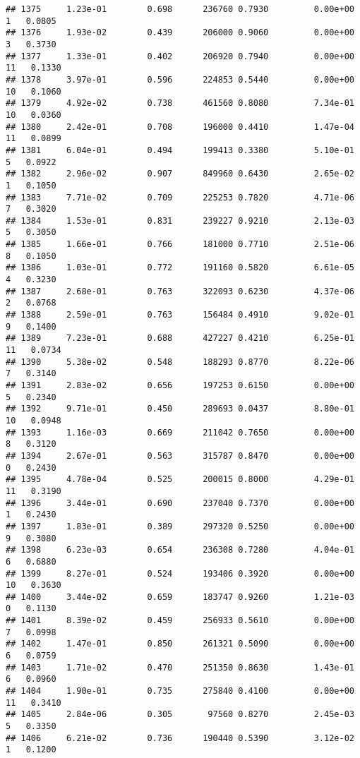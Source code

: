 \documentclass[
]{article}
\begin{document}
\begin{verbatim}
## 1375     1.23e-01        0.698      236760 0.7930         0.00e+00   1   0.0805
## 1376     1.93e-02        0.439      206000 0.9060         0.00e+00   3   0.3730
## 1377     1.33e-01        0.402      206920 0.7940         0.00e+00  11   0.1330
## 1378     3.97e-01        0.596      224853 0.5440         0.00e+00  10   0.1060
## 1379     4.92e-02        0.738      461560 0.8080         7.34e-01  10   0.0360
## 1380     2.42e-01        0.708      196000 0.4410         1.47e-04  11   0.0899
## 1381     6.04e-01        0.494      199413 0.3380         5.10e-01   5   0.0922
## 1382     2.96e-02        0.907      849960 0.6430         2.65e-02   1   0.1050
## 1383     7.71e-02        0.709      225253 0.7820         4.71e-06   7   0.3020
## 1384     1.53e-01        0.831      239227 0.9210         2.13e-03   5   0.3050
## 1385     1.66e-01        0.766      181000 0.7710         2.51e-06   8   0.1050
## 1386     1.03e-01        0.772      191160 0.5820         6.61e-05   4   0.3230
## 1387     2.68e-01        0.763      322093 0.6230         4.37e-06   2   0.0768
## 1388     2.59e-01        0.763      156484 0.4910         9.02e-01   9   0.1400
## 1389     7.23e-01        0.688      427227 0.4210         6.25e-01  11   0.0734
## 1390     5.38e-02        0.548      188293 0.8770         8.22e-06   7   0.3140
## 1391     2.83e-02        0.656      197253 0.6150         0.00e+00   5   0.2340
## 1392     9.71e-01        0.450      289693 0.0437         8.80e-01  10   0.0948
## 1393     1.16e-03        0.669      211042 0.7650         0.00e+00   8   0.3120
## 1394     2.67e-01        0.563      315787 0.8470         0.00e+00   0   0.2430
## 1395     4.78e-04        0.525      200015 0.8000         4.29e-01  11   0.3190
## 1396     3.44e-01        0.690      237040 0.7370         0.00e+00   1   0.2430
## 1397     1.83e-01        0.389      297320 0.5250         0.00e+00   9   0.3080
## 1398     6.23e-03        0.654      236308 0.7280         4.04e-01   6   0.6880
## 1399     8.27e-01        0.524      193406 0.3920         0.00e+00  10   0.3630
## 1400     3.44e-02        0.659      183747 0.9260         1.21e-03   0   0.1130
## 1401     8.39e-02        0.459      256933 0.5610         0.00e+00   7   0.0998
## 1402     1.47e-01        0.850      261321 0.5090         0.00e+00   6   0.0759
## 1403     1.71e-02        0.470      251350 0.8630         1.43e-01   6   0.0960
## 1404     1.90e-01        0.735      275840 0.4100         0.00e+00  11   0.3410
## 1405     2.84e-06        0.305       97560 0.8270         2.45e-03   5   0.3350
## 1406     6.21e-02        0.736      190440 0.5390         3.12e-02   1   0.1200

\end{verbatim}
\end{document}
